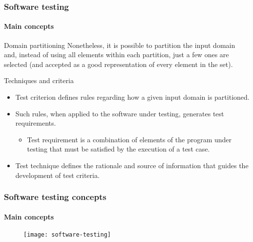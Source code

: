 \begin{frame}
\frametitle{Software testing}
\framesubtitle{Main concepts}

\begin{block:principle}{Domain partitioning}
Nonetheless, it is possible to partition the input domain and, instead of
using all elements within each partition, just a few ones are selected (and
accepted as a good representation of every element in the set).
\end{block:principle}

\begin{block:fact}{Techniques and criteria}
\begin{itemize}
	\item Test criterion defines rules regarding how a given input domain is
	partitioned.

	\item Such rules, when applied to the software under testing, generates
	test requirements.
	\begin{itemize}
		\item Test requirement is a combination of elements of the program
		under testing that must be satisfied by the execution of a test case.
	\end{itemize}

	\item Test technique defines the rationale and source of information that
	guides the development of test criteria.
\end{itemize}
\end{block:fact}
\end{frame}



\begin{frame}[c]
\frametitle{Software testing concepts}
\framesubtitle{Main concepts}

\begin{figure}
    \centering
    \texttt{[image: software-testing]}
\end{figure}
\end{frame}
